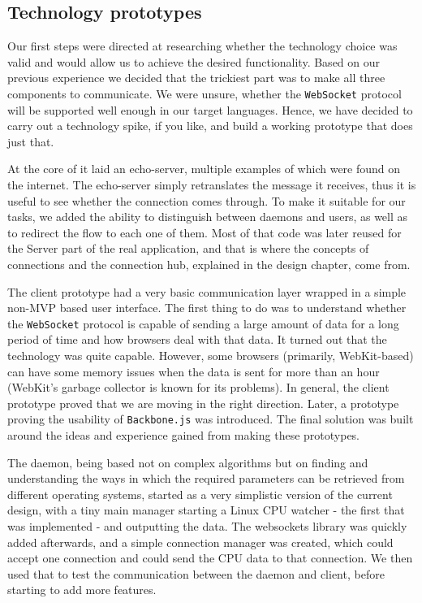 \documentclass{l3proj}
\begin{document}
\subsection{Technology prototypes}
\label{prototypes}


Our first steps were directed at researching whether the technology choice was valid and would allow us to achieve the desired functionality. Based on our previous experience we decided that the trickiest part was to make all three components to communicate. We were unsure, whether the \texttt{WebSocket} protocol will be supported well enough in our target languages. Hence, we have decided to carry out a technology spike, if you like, and build a working prototype that does just that.

At the core of it laid an echo-server, multiple examples of which were found on the internet. The echo-server simply retranslates the message it receives, thus it is useful to see whether the connection comes through. To make it suitable for our tasks, we added the ability to distinguish between daemons and users, as well as to redirect the flow to each one of them. Most of that code was later reused for the Server part of the real application, and that is where the concepts of connections and the connection hub, explained in the design chapter, come from.

The client prototype had a very basic communication layer wrapped in a simple non-MVP based user interface. The first thing to do was to understand whether the \texttt{WebSocket} protocol is capable of sending a large amount of data for a long period of time and how browsers deal with that data. It turned out that the technology was quite capable. However, some browsers (primarily, WebKit-based) can have some memory issues when the data is sent for more than an hour (WebKit's garbage collector is known for its problems). In general, the client prototype proved that we are moving in the right direction. Later, a prototype proving the usability of \texttt{Backbone.js} was introduced. The final solution was built around the ideas and experience gained from making these prototypes.

The daemon, being based not on complex algorithms but on finding and understanding the ways in which the required parameters can be retrieved from different operating systems, started as a very simplistic version of the current design, with a tiny main manager starting a Linux CPU watcher - the first that was implemented - and outputting the data. The websockets library was quickly added afterwards, and a simple connection manager was created, which could accept one connection and could send the CPU data to that connection. We then used that to test the communication between the daemon and client, before starting to add more features.
\end{document}
